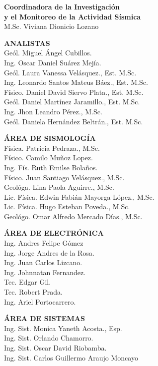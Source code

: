 \begin{multicols}{2}
\begin{flushleft}

{\bf \sffamily\textcolor{ocre}{Coordinadora  de la Investigación}} \\ 
{\bf \sffamily\textcolor{ocre}{y el Monitoreo de la Actividad Sísmica}} \\ 
M.Sc. Viviana Dionicio Lozano\\
\vspace{0.4cm}


{\bf \sffamily\textcolor{ocre}{ANALISTAS}}\\
Geól. Miguel Ángel Cubillos. \\
Ing. Oscar Daniel Suárez Mejía. \\
Geól. Laura Vanessa Velásquez., Est. M.Sc. \\
Ing. Leonardo Santos Mateus Báez., Est. M.Sc. \\
Físico. Daniel David Siervo Plata., Est. M.Sc. \\
Geól. Daniel Martínez Jaramillo., Est. M.Sc. \\
Ing. Jhon Leandro Pérez., M.Sc. \\
Geól. Daniela Hernández Beltrán., Est. M.Sc. \\
\vspace{0.4cm}

{\bf \sffamily\textcolor{ocre}{ÁREA DE SISMOLOGÍA}}\\ 
Física. Patricia Pedraza., M.Sc. \\
Físico. Camilo Muñoz Lopez. \\
Ing. Fís. Ruth Emilse Bolaños.\\
Físico. Juan Santiago Velásquez., M.Sc. \\
Geológa. Lina Paola Aguirre., M.Sc. \\
Lic. Física. Edwin Fabián Mayorga López., M.Sc.\\
Lic. Física. Hugo Esteban Poveda., M.Sc.\\
Geológo. Omar Alfredo Mercado Días., M.Sc.\\
\vspace{0.4cm}

{\bf \sffamily\textcolor{ocre}{ÁREA DE ELECTRÓNICA}}\\
Ing. Andres Felipe Gómez\\
Ing. Jorge Andres de la Rosa.\\
Ing. Juan Carlos Lizcano.\\
Ing. Johnnatan Fernandez.\\ 
Tec. Edgar Gil.\\
Tec. Robert Prada.\\
Ing. Ariel Portocarrero.\\
\vspace{0.4cm}

{\bf \sffamily\textcolor{ocre}{ÁREA DE SISTEMAS}}\\  
Ing. Sist. Monica Yaneth Acosta., Esp.\\
Ing. Sist. Orlando Chamorro. \\
Ing. Sist. Oscar David Riobamba. \\
Ing. Sist. Carlos Guillermo Araujo Moncayo \\
\end{flushleft}
\end{multicols}
